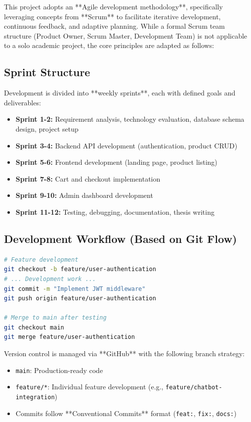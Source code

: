 \documentclass[12pt, a4paper]{report}
\begin{document}
This project adopts an **Agile development methodology**, specifically leveraging concepts from **Scrum** to facilitate iterative development, continuous feedback, and adaptive planning. While a formal Scrum team structure (Product Owner, Scrum Master, Development Team) is not applicable to a solo academic project, the core principles are adapted as follows:

\subsection{Sprint Structure}

Development is divided into **weekly sprints**, each with defined goals and deliverables:

\begin{itemize}
    \item \textbf{Sprint 1-2:} Requirement analysis, technology evaluation, database schema design, project setup
    \item \textbf{Sprint 3-4:} Backend API development (authentication, product CRUD)
    \item \textbf{Sprint 5-6:} Frontend development (landing page, product listing)
    \item \textbf{Sprint 7-8:} Cart and checkout implementation
    \item \textbf{Sprint 9-10:} Admin dashboard development
    \item \textbf{Sprint 11-12:} Testing, debugging, documentation, thesis writing
\end{itemize}

\subsection{Development Workflow (Based on Git Flow)}

\vspace{0.3cm}
\begin{lstlisting}[language=bash, caption=Git Branching Strategy Example]
# Feature development
git checkout -b feature/user-authentication
# ... Development work ...
git commit -m "Implement JWT middleware"
git push origin feature/user-authentication

# Merge to main after testing
git checkout main
git merge feature/user-authentication
\end{lstlisting}

Version control is managed via **GitHub** with the following branch strategy:

\begin{itemize}
    \item \texttt{main}: Production-ready code
    \item \texttt{feature/*}: Individual feature development (e.g., \texttt{feature/chatbot-integration})
    \item Commits follow **Conventional Commits** format (\texttt{feat:}, \texttt{fix:}, \texttt{docs:})
\end{itemize}
\end{document}
